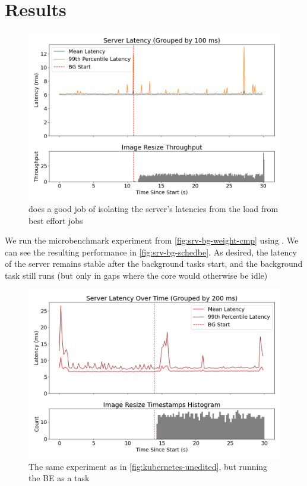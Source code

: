 \section{Results}

\begin{figure}[t]
    \centering
    \includegraphics[width=\columnwidth]{graphs/srv-bg-schedbe-low.png}
    \caption{ \beclass{} does a good job of isolating the server's latencies
     from the load from best effort jobs}\label{fig:srv-bg-schedbe}
\end{figure}

We run the microbenchmark experiment from \autoref{fig:srv-bg-weight-cmp} using
\beclass{}. We can see the resulting performance in
\autoref{fig:srv-bg-schedbe}. As desired, the latency of the server remains
stable after the background tasks start, and the background task still runs (but
only in gaps where the core would otherwise be idle)

\begin{figure}[t]
    \centering
    \includegraphics[width=\columnwidth]{graphs/kubernetes-schedbe.png}
    \caption{The same experiment as in \autoref{fig:kubernetes-unedited}, but
    running the BE as a \beclass{} task}\label{fig:kubernetes-schedbe}
\end{figure}

